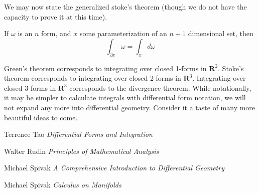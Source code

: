 We may now state the generalized stoke's theorem (though we do not have the capacity to prove it at this time).
%
\begin{theorem}
    If $\omega$ is an $n$ form, and $x$ some parameterization of an $n+1$ dimensional set, then
    \[ \int_{\partial x} \omega = \int_x d\omega \]
\end{theorem}
%
Green's theorem corresponds to integrating over closed 1-forms in $\mathbf{R}^2$. Stoke's theorem corresponds to integrating over closed 2-forms in $\mathbf{R}^3$. Integrating over closed 3-forms in $\mathbf{R}^3$ corresponds to the divergence theorem. While notationally, it may be simpler to calculate integrals with differential form notation, we will not expand any more into differential geometry. Consider it a taste of many more beautiful ideas to come.

\begin{thebibliography}{12}

 Terrence Tao
\emph{Differential Forms and Integration}

 Walter Rudin
\emph{Principles of Mathematical Analysis}

 Michael Spivak
\emph{A Comprehensive Introduction to Differential Geometry}

 Michael Spivak
\emph{Calculus on Manifolds}

\end{thebibliography}

